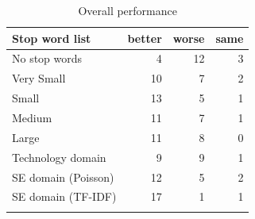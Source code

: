 \documentclass[conference]{IEEEtran}
\begin{document}
\begin{sloppy}
\begin{table}[]
\centering
\caption{Overall performance}
\begin{tabular}{lrrr}
\toprule
Stop word list & better & worse & same \\
\bottomrule
No stop words                                                        & \cellcolor{green}4                                     & \cellcolor{orange}12                                   & 3                                   \\
Very Small                                                           & \cellcolor{green}10                                    & \cellcolor{orange}7                                    & 2                                   \\
Small                                                                & \cellcolor{green}13                                    & \cellcolor{orange}5                                    & 1                                   \\
Medium                                                               & \cellcolor{green}11                                    & \cellcolor{orange}7                                    & 1                                   \\
Large                                                                & \cellcolor{green}11                                    & \cellcolor{orange}8                                    & 0                                   \\
Technology domain                                                     & \cellcolor{green}9                                     & \cellcolor{orange}9                                    & 1                                   \\
SE domain (Poisson) & \cellcolor{green}12                                    & \cellcolor{orange}5                                    & 2                                   \\
SE domain (TF-IDF) & \cellcolor{green}17                                    & \cellcolor{orange}1                                    & 1    \\
\bottomrule
\label{table:ten}
\end{tabular}
\end{table}


\end{sloppy}
\end{document}
